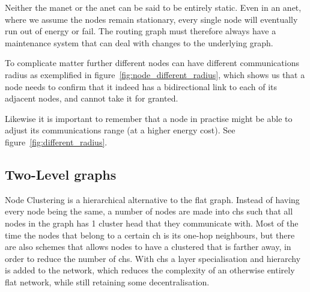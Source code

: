 
Neither the \ac{manet} or the \ac{anet} can be said to be entirely static. Even in an \ac{anet}, where we assume the nodes remain stationary, every single node will eventually run out of energy or fail. The routing graph must therefore always have a maintenance system that can deal with changes to the underlying graph. 

To complicate matter further different nodes can have different communications radius as exemplified in figure~\ref{fig:node_different_radius}, which shows us that a node needs to confirm that it indeed has a bidirectional link to each of its adjacent nodes, and cannot take it for granted.


Likewise it is important to remember that a node in practise might be able to adjust its communications range (at a higher energy cost). See figure~\ref{fig:different_radius}.

\subsection{Two-Level graphs}

\label{cluster methods}
Node Clustering is a hierarchical alternative to the flat graph. Instead of having every node being the same, a number of nodes are made into \acp{ch} such that all nodes in the graph has 1 cluster head that they communicate with. Most of the time the nodes that belong to a certain \ac{ch} is its one-hop neighbours, but there are also schemes that allows nodes to have a clustered that is farther away, in order to reduce the number of \acp{ch}. With \acp{ch} a layer specialisation and hierarchy is added to the network, which reduces the complexity of an otherwise entirely flat network, while still retaining some decentralisation.


